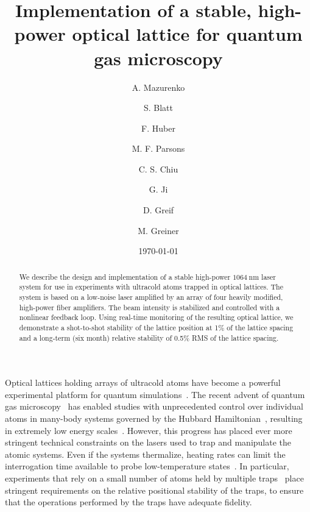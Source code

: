 \documentclass[twocolumn,aps,pra,showpacs,preprintnumbers,bibnotes]{revtex4-1}
\newcommand\unit[2]{\ensuremath{#1~\mathrm{{#2}}}}
\newcommand\FIXME{{\color{red}\ensuremath{\mathrm{FIXME}}}}
\begin{document}
\title{Implementation of a stable, high-power optical lattice for quantum gas microscopy}

\author{A. Mazurenko}
\altaffiliation{
  Present address: \FIXME{}}
\author{S. Blatt}
\author{F. Huber}
\author{M. F. Parsons}
\altaffiliation{
  Present address: \FIXME{} TOO}
\author{C. S. Chiu}
\author{G. Ji}
\author{D. Greif}
\author{M. Greiner}

\date{\today}
\begin{abstract}
  We describe the design and implementation of a stable high-power \unit{1064}{nm} laser system for use in experiments with ultracold atoms trapped in optical lattices. The system is based on a low-noise laser amplified by an array of four heavily modified, high-power fiber amplifiers. The beam intensity is stabilized and controlled with a nonlinear feedback loop. Using real-time monitoring of the resulting optical lattice, we demonstrate a shot-to-shot stability of the lattice position at 1\% of the lattice spacing and a long-term (six month) relative stability of 0.5\% RMS of the lattice spacing.
\end{abstract}
\maketitle

Optical lattices holding arrays of ultracold atoms have become a powerful experimental platform for quantum simulations~\cite{Friedenauer2008, Kim2010, Struck2011, Simon2011, Yan2013, Drewes2016, Murmann2015}.
The recent advent of quantum gas microscopy~\cite{Bakr2009, Sherson2010, Haller2015, Cheuk2015, Parsons2015, Edge2015, Omran2015, Greif2016, Cheuk2016, Parsons2016, Boll2016, Cheuk2016a, Brown2017} has enabled studies with unprecedented control over individual atoms in many-body systems governed by the Hubbard Hamiltonian~\cite{Hubbard1963}, resulting in extremely low energy scales~\cite{Mazurenko2017}.
However, this progress has placed ever more stringent technical constraints on the lasers used to trap and manipulate the atomic systems.
Even if the systems thermalize, heating rates can limit the interrogation time available to probe low-temperature states~\cite{Blatt2015}.
In particular, experiments that rely on a small number of atoms held by multiple traps~\cite{Preiss2015, Choi2016, Mazurenko2017} place stringent requirements on the relative positional stability of the traps, to ensure that the operations performed by the traps have adequate fidelity.
\end{document}

